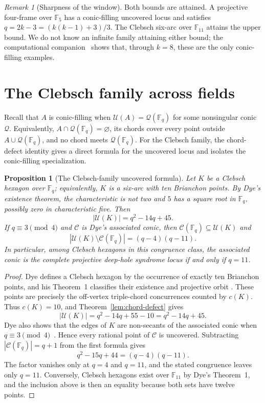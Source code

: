 \documentclass[11pt]{article}
\newtheorem{proposition}[theorem]{Proposition}
\theoremstyle{definition}
\theoremstyle{remark}
\newtheorem{remark}[theorem]{Remark}
\newcommand{\F}{\mathbb{F}}
\newcommand{\cC}{\mathcal{C}}
\newcommand{\cU}{\mathcal{U}}
\begin{document}
\begin{remark}[Sharpness of the window]
Both bounds are attained. A projective four-frame over $\F_5$ has a
conic-filling uncovered locus and satisfies
$q=2k-3=(k(k-1)+3)/3$. The Clebsch six-arc over $\F_{11}$ attains the
upper bound. We do not know an infinite family attaining either bound; the
computational companion~\cite{RuddComputational2026} shows that, through
$k=8$, these are the only conic-filling examples.
\end{remark}

\section{The Clebsch family across fields}
\label{sec:clebsch-family}

Recall that $A$ is conic-filling when
$\cU(A)=\mathcal Q(\F_q)$ for some nonsingular conic $\mathcal Q$.
Equivalently,
$A\cap\mathcal Q(\F_q)=\varnothing$, its chords cover every point outside
$A\cup\mathcal Q(\F_q)$, and no chord meets $\mathcal Q(\F_q)$.
For the Clebsch family, the chord-defect identity gives a direct formula
for the uncovered locus and isolates the conic-filling specialization.

\begin{proposition}[The Clebsch-family uncovered formula]
\label{prop:clebsch-family-uncovered}
Let $K$ be a Clebsch hexagon over $\F_q$; equivalently, $K$ is a six-arc
with ten Brianchon points. By Dye's existence theorem, the characteristic
is not two and $5$ has a square root in $\F_q$, possibly zero in
characteristic five. Then
\[
 |\cU(K)|=q^2-14q+45.
\]
If $q\equiv3\pmod4$ and $\cC$ is Dye's associated conic, then
$\cC(\F_q)\subseteq\cU(K)$ and
\[
 |\cU(K)\setminus\cC(\F_q)|=(q-4)(q-11).
\]
In particular, among Clebsch hexagons in this congruence class, the
associated conic is the complete projective deep-hole syndrome locus if and
only if $q=11$.
\end{proposition}

\begin{proof}
Dye defines a Clebsch hexagon by the occurrence of exactly ten Brianchon
points, and his Theorem~1 classifies their existence and projective orbit
\cite[p.~271; Theorem~1, pp.~275--276]{Dye1991}. These points are precisely
the off-vertex
triple-chord concurrences counted by $c(K)$. Thus $c(K)=10$, and
Theorem~\ref{lem:chord-defect} gives
\[
 |\cU(K)|=q^2-14q+55-10=q^2-14q+45.
\]
Dye also shows that the edges of $K$ are non-secants of the associated conic
when $q\equiv3\pmod4$~\cite[discussion preceding Theorem~6,
pp.~281--282]{Dye1991}. Hence every rational point of $\cC$ is uncovered.
Subtracting $|\cC(\F_q)|=q+1$ from the first formula gives
\[
 q^2-15q+44=(q-4)(q-11).
\]
The factor vanishes only at $q=4$ and $q=11$, and the stated congruence
leaves only $q=11$. Conversely, Clebsch hexagons exist over $\F_{11}$ by
Dye's Theorem~1, and the inclusion above is then an equality because both
sets have twelve points.
\end{proof}
\end{document}
